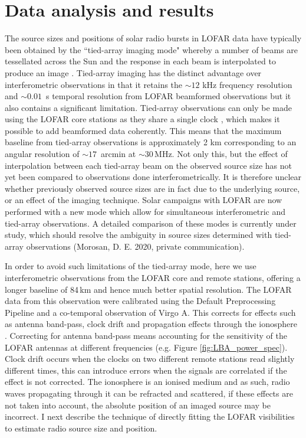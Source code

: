 \section{Data analysis and results} \label{sec:data}
The source sizes and positions of solar radio bursts in LOFAR data have typically been obtained by the ``tied-array imaging mode" \citep{Morosan2014} whereby a number of beams are tessellated across the Sun and the response in each beam is interpolated to produce an image \citep[e.g.][]{Reid2017,Kontar2017,Zucca2018, Morosan2019}. Tied-array imaging has the distinct advantage over interferometric observations in that it retains the ${\sim} 12$ kHz frequency resolution and ${\sim} 0.01$~s temporal resolution from LOFAR beamformed observations but it also contains a significant limitation. Tied-array observations can only be made using the LOFAR core stations as they share a single clock \citep{DeGasperin2019}, which makes it possible to add beamformed data coherently. This means that the maximum baseline from tied-array observations is approximately 2 km corresponding to an angular resolution of ${\sim} 17$~arcmin at ${\sim} 30$\,MHz. Not only this, but the effect of interpolation between each tied-array beam on the observed source size has not yet been compared to observations done interferometrically. It is therefore unclear whether previously observed source sizes are in fact due to the underlying source, or an effect of the imaging technique. Solar campaigns with LOFAR are now performed with a new mode which allow for simultaneous interferometric and tied-array observations. A detailed comparison of these modes is currently under study, which should resolve the ambiguity in source sizes determined with tied-array observations (Morosan, D. E. 2020, private communication). 

In order to avoid such limitations of the tied-array mode, here we use interferometric observations from the LOFAR core and remote stations, offering a longer baseline of 84\,km and hence much better spatial resolution.
The LOFAR data from this observation were calibrated using the Default Preprocessing Pipeline \cite[DPPP;][]{VanDiepen2018} and a co-temporal observation of Virgo A. This corrects for effects such as antenna band-pass, clock drift and propagation effects through the ionosphere \citep{DeGasperin2019}. Correcting for antenna band-pass means accounting for the sensitivity of the LOFAR antennas at different frequencies (e.g. Figure \ref{fig:LBA_power_spec}). Clock drift occurs when the clocks on two different remote stations read slightly different times, this can introduce errors when the signals are correlated if the effect is not corrected. The ionosphere is an ionised medium and as such, radio waves propagating through it can be refracted and scattered, if these effects are not taken into account, the absolute position of an imaged source may be incorrect.
I next describe the technique of directly fitting the LOFAR visibilities to estimate radio source size and position.

